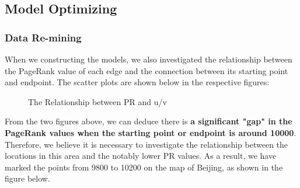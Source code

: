\subsection{Model Optimizing}

\subsubsection{Data Re-mining}

\indent\indent When we constructing the models, we also investigated the relationship between the PageRank value of each edge and the connection between its starting point and endpoint. The scatter plots are shown below in the respective figures: 
\begin{figure}[H]%
    \centering
    \caption{The Relationship between PR and u/v}
\end{figure}
\indent From the two figures above, we can deduce there is \textbf{a significant "gap" in the PageRank values when the starting point or endpoint is around 10000}. Therefore, we believe it is necessary to investigate the relationship between the locations in this area and the notably lower PR values. As a result, we have marked the points from 9800 to 10200 on the map of Beijing, as shown in the figure below.
